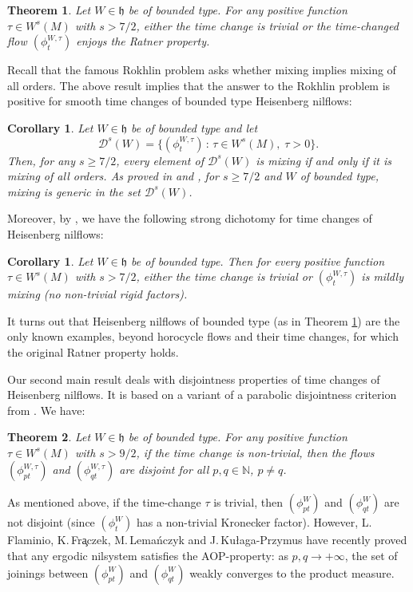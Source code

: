 \documentclass[JEP,XML,SOM,Unicode,NoEqCountersInSection]{cedram}
\let\mathcal\mathscr
\newcommand{\sep}{\,:\,}
\theoremstyle{definition}
\theoremstyle{plain}
\newtheorem{theorem}{Theorem}
\newtheorem{corollary}[definition]{Corollary}
\newcommand\NN{\mathbb{N}}
\newcommand{\cD}{\mathcal D}
\begin{document}
\begin{theorem}\label{main:thm'} Let $W\in \mathfrak h$ be of bounded type. For any positive function $\tau\in W^s(M)$ with $s>7/2$, either the time change is trivial or the time-changed flow $(\phi_t^{W,\tau})$ enjoys the Ratner property.
\end{theorem}

Recall that the famous Rokhlin problem asks whether mixing implies mixing of all orders.
The above result implies that the answer to the Rokhlin problem is positive for smooth time changes of bounded type Heisenberg nilflows:
\begin{corollary} Let $W\in \mathfrak h$ be of bounded type and let
\[
\cD^s(W)=\{(\phi_t^{W,\tau})\sep \tau\in W^s(M),\; \tau>0\}.
\]
Then, for any $s\geq 7/2$, every element of $\cD^s(W)$ is mixing if and only if it is mixing of all orders.
As proved in \cite{AFU} and \cite{FK}, for $s\geq 7/2$ and $W$ of bounded type, mixing is generic in the set $\cD^s(W)$.
\end{corollary}

Moreover, by \cite{KL}, we have the following strong dichotomy for time changes of Heisenberg nilflows:
\begin{corollary}\label{corA} Let $W\in \mathfrak h$ be of bounded type. Then for every positive function $\tau\in W^s(M)$ with $s>7/2$, either
the time change is trivial or $(\phi_t^{W,\tau})$ is mildly mixing (no non-trivial rigid factors).
\end{corollary}

It turns out that Heisenberg nilflows of bounded type (as in Theorem \ref{main:thm'}) are the only known examples, beyond horocycle flows and their time changes, for which the original Ratner property holds.

Our second main result deals with disjointness properties of time changes of Heisenberg nilflows. It is based on a variant of a parabolic disjointness criterion from \cite{KLU}. We have:

\begin{theorem}\label{thm:main2'} Let $W\in \mathfrak h$ be of bounded type. For any positive function $\tau\in W^s(M)$ with $s>9/2$, if the time change is non-trivial, then the flows $(\phi_{pt}^{W,\tau})$ and $(\phi_{qt}^{W,\tau})$ are disjoint for
all $p,q\in \NN$, $p\neq q$.
\end{theorem}

As mentioned above, if the time-change $\tau$
is trivial, then $(\phi_{pt}^{W})$ and $(\phi_{qt}^{W})$ are not disjoint (since $(\phi_t^W)$ has a non-trivial Kronecker factor). However, L.\,Flaminio, K.\,Fr{\selectfont\c{a}}czek, M.\,Lema{\'n}czyk and J.\,Ku{\l}aga-Przymus \cite{FFKL} have recently proved that any ergodic nilsystem satisfies the AOP-property: as $p,q\to +\infty$, the set of joinings between $(\phi_{pt}^{W})$ and $(\phi_{qt}^{W})$ weakly converges to the product measure.
\end{document}
